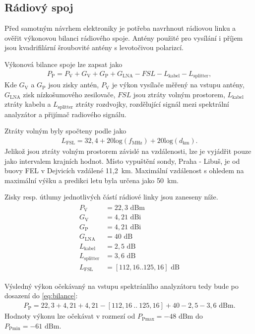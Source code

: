 \documentclass[twoside]{ctuthesis}
\newcommand{\mt}[1]{\text{#1}}
\theoremstyle{plain}
\theoremstyle{definition}
\theoremstyle{note}
\begin{document}
		\subsection{Rádiový spoj}
		Před samotným návrhem elektroniky je potřeba navrhnout rádiovou linku a ověřit výkonovou bilanci rádiového spoje. Antény použité pro vysílání i příjem jsou kvadrifilární šroubovité antény s levotočivou polarizcí. 

		Výkonová bilance spoje lze zapsat jako
		\begin{align}
			P_\mt{P} = P_\mt{V} + G_\mt{V} + G_\mt{P} + G_\mt{LNA} - FSL - L_\mt{kabel} - L_\mt{splitter},
			\label{eq:bilance}
		\end{align}
		Kde $G_\mt{V}$ a $G_\mt{P}$ jsou zisky antén, $P_\mt{V}$ je výkon vysílače měřený na vstupu antény, $G_\mt{LNA}$ zisk nízkošumového zesilovače, $FSL$ jsou ztráty volným prostorem, $L_\mt{kabel}$ ztráty kabelu a $L_\mt{splitter}$ ztráty rozdvojky, rozdělující signál mezi spektrální analyzátor a přijímač radiového signálu.

		Ztráty volným byly spočteny podle \cite{zaklady:sireni:vln} jako
		\begin{align}
			L_\mt{FSL} = 32,4 + 20\mt{log}(f_\mt{MHz}) + 20\mt{log}(d_\mt{km}).
		\end{align}
		Jelikož jsou ztráty volným prostorem závislé na vzdálenosti, lze je vyjádřit pouze jako intervalem krajních hodnot. Místo vypuštění sondy, Praha - Libuš, je od buovy FEL v Dejvicích vzdálené 11,2~km. Maximální vzdálenost s ohledem na maximální výšku a predikci letu byla určena jako 50~km.

		Zisky resp. útlumy jednotlivých částí rádiové linky jsou zaneseny níže.
		\begin{align*}
			\begin{split}
				P_\mt{V} &= 22{,}3\mt{ dBm}\\
				G_\mt{V} &= 4{,}21\mt{ dBi}\\
				G_\mt{P} &= 4{,}21\mt{ dBi}\\
				G_\mt{LNA} &= 40 \mt{ dB}\\
				L_\mt{kabel} &= 2{,}5\mt{ dB}\\
				L_\mt{splitter} &= 3{,}6\mt{ dB}\\
				L_\mt{FSL} &= [112{,}16 .. 125{,}16]\mt{ dB}
			\end{split}
		\end{align*}

		Výsledný výkon očekávaný na vstupu spektránlího analyzátoru tedy bude po dosazení do \eqref{eq:bilance}:
		\begin{align}
			P_\mt{P} = 22{,}3 + 4{,}21 + 4{,}21 - [112{,}16~..~125{,}16] + 40 - 2{,}5 - 3{,}6\mt{ dBm}.
		\end{align}
		Hodnoty výkonu lze očekávat v rozmezí od $P_\mt{Pmax} = -48\mt{ dBm}$ do $P_\mt{Pmin} = -61\mt{ dBm}$.
\end{document}
